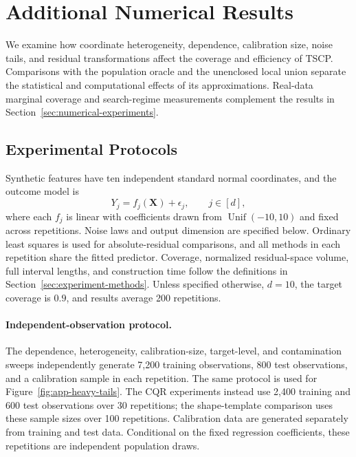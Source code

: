 
\begingroup
\color{blue}
\setlength{\emergencystretch}{2em}

\section{Additional Numerical Results}
\label{app:additional-experiments}

We examine how coordinate heterogeneity, dependence, calibration size, noise
tails, and residual transformations affect the coverage and efficiency of
TSCP. Comparisons with the population oracle and the unenclosed local union
separate the statistical and computational effects of its approximations.
Real-data marginal coverage and search-regime measurements complement the
results in Section~\ref{sec:numerical-experiments}.

\subsection{Experimental Protocols}
\label{app:experimental-protocols}
\label{app:legacy-experiments}

Synthetic features have ten independent standard normal coordinates, and
the outcome model is
\begin{equation}
  Y_j=f_j(\boldsymbol X)+\epsilon_j,\qquad j\in[d],
  \label{eq:data-generator}
\end{equation}
where each $f_j$ is linear with coefficients drawn from
$\operatorname{Unif}(-10,10)$ and fixed across repetitions. Noise laws and
output dimension are specified below. Ordinary least squares is used for
absolute-residual comparisons, and all methods in each repetition share
the fitted predictor. Coverage, normalized residual-space volume, full
interval lengths, and construction time follow the definitions in
Section~\ref{sec:experiment-methods}. Unless specified otherwise,
$d=10$, the target coverage is $0.9$, and results average 200 repetitions.

\paragraph{Independent-observation protocol.}
The dependence, heterogeneity, calibration-size, target-level, and
contamination sweeps independently generate 7,200 training observations,
800 test observations, and a calibration sample in each repetition.
The same protocol is used for Figure~\ref{fig:app-heavy-tails}.
The CQR experiments instead use 2,400 training and 600 test observations
over 30 repetitions; the shape-template comparison uses these sample sizes
over 100 repetitions. Calibration data are generated separately from
training and test data. Conditional on the fixed regression coefficients,
these repetitions are independent population draws.

